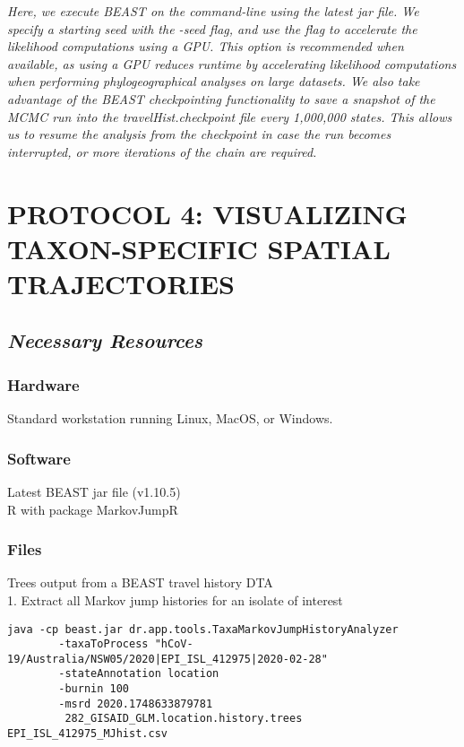 \documentclass{article}
\newcommand{\ann}[1]{
\begin{adjustwidth}{0.5cm}{}
\it{#1}\\
\end{adjustwidth}}
\newcommand{\code}[1]{
{\upshape\ttfamily{#1}}}
\begin{document}
\ann{Here, we execute BEAST on the command-line using the latest jar file. We specify a starting seed with the -seed flag, and use the \code{-beagle\_cuda} flag to accelerate the likelihood computations using a GPU. This option is recommended when available, as using a GPU reduces runtime by accelerating likelihood computations when performing phylogeographical analyses on large datasets. We also take advantage of the BEAST checkpointing functionality to save a snapshot of the MCMC run into the travelHist.checkpoint file every 1,000,000 states. This allows us to resume the analysis from the checkpoint in case the run becomes interrupted, or more iterations of the chain are required.}

\section*{PROTOCOL 4: VISUALIZING TAXON-SPECIFIC SPATIAL TRAJECTORIES}
\subsection*{\textbf{\textit{Necessary Resources}}}
\subsubsection*{Hardware}
Standard workstation running Linux, MacOS, or Windows. 

\subsubsection*{Software}
Latest BEAST jar file (v1.10.5)\\
R with package MarkovJumpR

\subsubsection*{Files}
Trees output from a BEAST travel history DTA \\

1. Extract all Markov jump histories for an isolate of interest
\begin{verbatim}
java -cp beast.jar dr.app.tools.TaxaMarkovJumpHistoryAnalyzer 
        -taxaToProcess "hCoV-19/Australia/NSW05/2020|EPI_ISL_412975|2020-02-28" 
        -stateAnnotation location
        -burnin 100
        -msrd 2020.1748633879781
         282_GISAID_GLM.location.history.trees EPI_ISL_412975_MJhist.csv
\end{verbatim}
\end{document}
